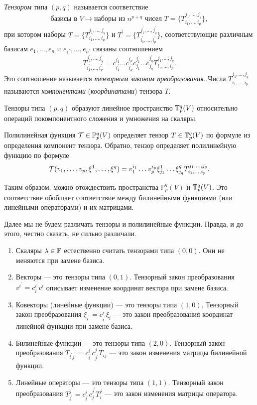 \begin{definition}
    \textit{Тензором} типа $(p, q)$ называется соответствие
    \[
        \text{базисы в $V$} \mapsto \text{наборы из $n^{p + q}$ чисел $T = \{T_{i_1, \ldots, i_p}^{j_1, \ldots, j_q}\}$},
    \]
    при котором наборы $T = \{T_{i_1, \ldots, i_p}^{j_1, \ldots, j_q}\}$ и $T^\prime = \{T_{i_1^\prime, \ldots, i_p^\prime}^{j_1^\prime, \ldots, j_q^\prime}\}$, соответствующие различным базисам $e_1, \ldots, e_n$ и $e_{1^\prime}, \ldots, e_{n^\prime}$ связаны соотношением
    \[
        T_{i_1^\prime, \ldots, i_p^\prime}^{j_1^\prime, \ldots, j_q^\prime} = c^{i_1}_{i_1^\prime}\ldots c^{i_p}_{i_p^\prime}c^{j_1^\prime}_{j_1}\ldots c^{j_q^\prime}_{j_q}T_{i_1, \ldots, i_p}^{j_1, \ldots, j_q}.
    \]
    Это соотношение называется \textit{тензорным законом преобразования}. Числа $T_{i_1, \ldots, i_p}^{j_1, \ldots, j_q}$ называются \textit{компонентами} (\textit{координатами}) тензора $T$.
\end{definition}

Тензоры типа $(p, q)$ образуют линейное пространство $\mathbb{T}_p^q(V)$ относительно операций покомпонентного сложения и умножения на скаляры.

Полилинейная функция $\mathcal{T} \in \mathbb{P}_p^q(V)$ определяет тензор $T \in \mathbb{T}_p^q(V)$ по формуле из определения компонент тензора. Обратно, тензор определяет полилинейную функцию по формуле
\[
    \mathcal{T}(v_1, \ldots, v_p, \xi^1, \ldots, \xi^q) = v_1^{i_1}\ldots v_p^{i_p}\xi^1_{j_1}\ldots\xi^q_{j_q}T_{i_1, \ldots, i_p}^{j_1, \ldots, j_q}.
\]

Таким образом, можно отождествить пространства $\mathbb{P}_p^q(V)$ и $\mathbb{T}_p^q(V)$. Это соответствие обобщает соответствие между билинейными функциями (или линейными операторами) и их матрицами.

Далее мы не будем различать тензоры и полилинейные функции. Правда, и до этого, честно сказать, не сильно различали.

\begin{example}
    \begin{enumerate}
        \item Скаляры $\lambda \in \mathbb{F}$ естественно считать тензорами типа $(0, 0)$. Они не меняются при замене базиса.
        \item Векторы --- это тензоры типа $(0, 1)$. Тензорный закон преобразования $v^{i^\prime} = c^{i^\prime}_iv^i$ описывает изменение координат вектора при замене базиса.
        \item Ковекторы (линейные функции) --- это тензоры типа $(1, 0)$. Тензорный закон преобразования $\xi_{i^\prime} = c^i_{i^\prime}\xi_i$ --- это закон преобразования координат линейной функции при замене базиса.
        \item Билинейные функции --- это тензоры типа $(2, 0)$. Тензорный закон преобразования $T_{i^\prime j^\prime} = c^i_{i^\prime}c^j_{j^\prime}T_{ij}$ --- это закон изменения матрицы билинейной функции.
        \item Линейные операторы --- это тензоры типа $(1, 1)$. Тензорный закон преобразования $T_{i^\prime}^{j^\prime} = c^i_{i^\prime}c^{j^\prime}_jT_i^j$ --- это закон изменения матрицы оператора.
    \end{enumerate}
\end{example}


